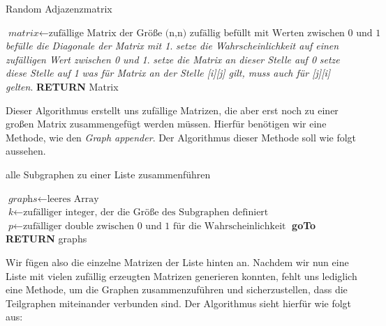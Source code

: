 \begin{algorithm}
\caption{Random Adjazenzmatrix}\label{randomAdjacency}
\begin{algorithmic}[1]
\State $\textit{matrix} \gets \text{zufällige Matrix der Größe (n,n) zufällig befüllt mit Werten zwischen 0 und 1}$
\State \textit{befülle die Diagonale der Matrix mit 1}.
\EndFor
{}
\State \textit{setze die Wahrscheinlichkeit auf einen zufälligen Wert zwischen 0 und 1}.
\State \textit{setze die Matrix an dieser Stelle auf 0}
\Else 
\State \textit{setze diese Stelle auf 1}
\EndIf
\EndFor
{}
\State \textit{was für Matrix an der Stelle [i][j] gilt, muss auch für [j][i] gelten}.
\State \textbf{RETURN} Matrix
\EndFor
\EndProcedure
\end{algorithmic}
\end{algorithm}

Dieser Algorithmus erstellt uns zufällige Matrizen, die aber erst noch zu einer großen Matrix zusammengefügt werden müssen. Hierfür benötigen wir eine Methode, wie den \textit{Graph appender}. Der Algorithmus dieser Methode soll wie folgt aussehen. 

\begin{algorithm}
\caption{alle Subgraphen zu einer Liste zusammenführen}\label{GraphAppender}
\begin{algorithmic}[1]
\State $\textit{graphs} \gets \text{leeres Array}$
\State $\textit{k} \gets \text{zufälliger integer, der die Größe des Subgraphen definiert}$
\State $\textit{p} \gets \text{zufälliger double zwischen 0 und 1 für die Wahrscheinlichkeit}$
\State \textbf{goTo} 
\State {} \textbf{RETURN} graphs 
\EndFor
\EndProcedure
\end{algorithmic}
\end{algorithm}

\newpage
Wir fügen also die einzelne Matrizen der Liste hinten an.
Nachdem wir nun eine Liste mit vielen zufällig erzeugten Matrizen generieren konnten, fehlt uns lediglich eine Methode, um die Graphen zusammenzuführen und sicherzustellen, dass die Teilgraphen miteinander verbunden sind. Der Algorithmus sieht hierfür wie folgt aus:

